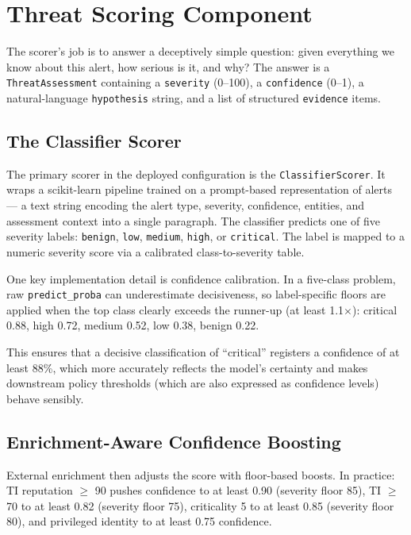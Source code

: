 \section{Threat Scoring Component}
\label{sec:impl-scoring}

The scorer's job is to answer a deceptively simple question: given everything we know about this alert, how serious is it, and why? The answer is a \texttt{ThreatAssessment} containing a \texttt{severity} (0--100), a \texttt{confidence} (0--1), a natural-language \texttt{hypothesis} string, and a list of structured \texttt{evidence} items.

\subsection{The Classifier Scorer}

The primary scorer in the deployed configuration is the \texttt{ClassifierScorer}. It wraps a scikit-learn pipeline trained on a prompt-based representation of alerts --- a text string encoding the alert type, severity, confidence, entities, and assessment context into a single paragraph. The classifier predicts one of five severity labels: \texttt{benign}, \texttt{low}, \texttt{medium}, \texttt{high}, or \texttt{critical}. The label is mapped to a numeric severity score via a calibrated class-to-severity table.

One key implementation detail is confidence calibration. In a five-class problem, raw \texttt{predict\_proba} can underestimate decisiveness, so label-specific floors are applied when the top class clearly exceeds the runner-up (at least 1.1$\times$): critical 0.88, high 0.72, medium 0.52, low 0.38, benign 0.22.

This ensures that a decisive classification of ``critical'' registers a confidence of at least 88\%, which more accurately reflects the model's certainty and makes downstream policy thresholds (which are also expressed as confidence levels) behave sensibly.

\subsection{Enrichment-Aware Confidence Boosting}

External enrichment then adjusts the score with floor-based boosts. In practice: TI reputation $\geq$ 90 pushes confidence to at least 0.90 (severity floor 85), TI $\geq$ 70 to at least 0.82 (severity floor 75), criticality 5 to at least 0.85 (severity floor 80), and privileged identity to at least 0.75 confidence.


